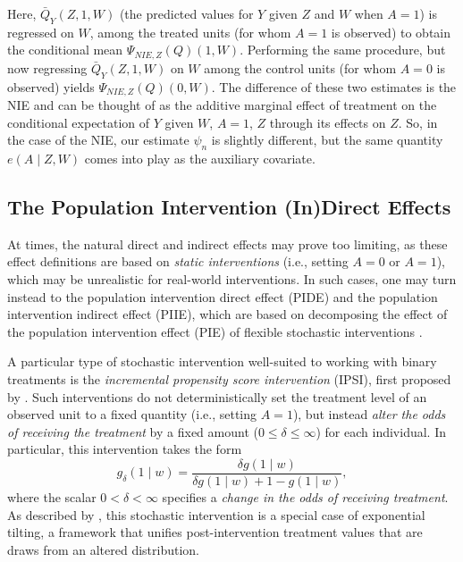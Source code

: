 \documentclass[12pt, krantz2,]{krantz}
\theoremstyle{definition}
\theoremstyle{definition}
\theoremstyle{definition}
\newcommand{\1}{\mathbbm{1}}
\begin{document}
Here, \(\bar{Q}_Y(Z, 1, W)\) (the predicted values for \(Y\) given \(Z\) and \(W\) when
\(A = 1\)) is regressed on \(W\), among the treated units (for whom \(A = 1\) is
observed) to obtain the conditional mean \(\Psi_{NIE, Z}(Q)(1, W)\). Performing
the same procedure, but now regressing \(\bar{Q}_Y(Z, 1, W)\) on \(W\) among the
control units (for whom \(A = 0\) is observed) yields \(\Psi_{NIE,Z}(Q)(0, W)\). The
difference of these two estimates is the NIE and can be thought of as the
additive marginal effect of treatment on the conditional expectation of \(Y\)
given \(W\), \(A = 1\), \(Z\) through its effects on \(Z\). So, in the case of the NIE,
our estimate \(\psi_n\) is slightly different, but the same quantity \(e(A \mid Z, W)\) comes into play as the auxiliary covariate.

\hypertarget{the-population-intervention-indirect-effects}{%
\subsection{The Population Intervention (In)Direct Effects}\label{the-population-intervention-indirect-effects}}

At times, the natural direct and indirect effects may prove too limiting, as
these effect definitions are based on \emph{static interventions} (i.e., setting
\(A = 0\) or \(A = 1\)), which may be unrealistic for real-world interventions. In
such cases, one may turn instead to the population intervention direct effect
(PIDE) and the population intervention indirect effect (PIIE), which are based
on decomposing the effect of the population intervention effect (PIE) of
flexible stochastic interventions \citep{diaz2020causal}.

A particular type of stochastic intervention well-suited to working with binary
treatments is the \emph{incremental propensity score intervention} (IPSI), first
proposed by \citet{kennedy2017nonparametric}. Such interventions do not
deterministically set the treatment level of an observed unit to a fixed
quantity (i.e., setting \(A = 1\)), but instead \emph{alter the odds of receiving the
treatment} by a fixed amount (\(0 \leq \delta \leq \infty\)) for each individual.
In particular, this intervention takes the form
\begin{equation*}
  g_{\delta}(1 \mid w) = \frac{\delta g(1 \mid w)}{\delta g(1 \mid w) + 1
  - g(1\mid w)},
\end{equation*}
where the scalar \(0 < \delta < \infty\) specifies a \emph{change in the odds of
receiving treatment}. As described by \citet{diaz2020causal}, this stochastic
intervention is a special case of exponential tilting, a framework that unifies
post-intervention treatment values that are draws from an altered distribution.
\end{document}
